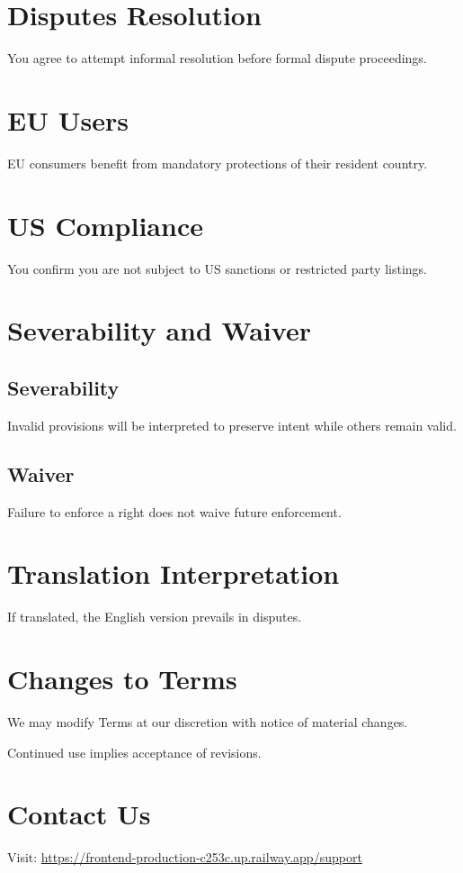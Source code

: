 \documentclass[11pt, a4paper]{report}
\begin{document}
\section*{Disputes Resolution}
You agree to attempt informal resolution before formal dispute proceedings.

\section*{EU Users}
EU consumers benefit from mandatory protections of their resident country.

\section*{US Compliance}
You confirm you are not subject to US sanctions or restricted party listings.

\section*{Severability and Waiver}

\subsection*{Severability}
Invalid provisions will be interpreted to preserve intent while others remain valid.

\subsection*{Waiver}
Failure to enforce a right does not waive future enforcement.

\section*{Translation Interpretation}
If translated, the English version prevails in disputes.

\section*{Changes to Terms}
We may modify Terms at our discretion with notice of material changes.

Continued use implies acceptance of revisions.

\section*{Contact Us}
Visit: \url{https://frontend-production-c253c.up.railway.app/support}
\end{document}
